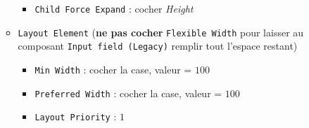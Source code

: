 \documentclass[a4paper,10pt]{article}
\newenvironment{solution}%
{\begin{tcolorbox}[breakable,colback=red!5!white,colframe=red!75!black,title=Solution]}%
{\end{tcolorbox}}
\begin{document}
\begin{solution}
\begin{itemize}
\begin{itemize}
\begin{itemize}
				\item \texttt{Child Force Expand} : cocher \textit{Height}
			\end{itemize}			
			\item \texttt{Layout Element} (\textbf{ne pas cocher} \texttt{Flexible Width} pour laisser au composant \texttt{Input field (Legacy)} remplir tout l'espace restant)
			\begin{itemize}
				\item \texttt{Min Width} : cocher la case, valeur = $100$
				\item \texttt{Preferred Width} : cocher la case, valeur = $100$
				\item \texttt{Layout Priority} : $1$
			\end{itemize}		
		\end{itemize}				
	

\end{itemize}
\end{solution}
\end{document}
